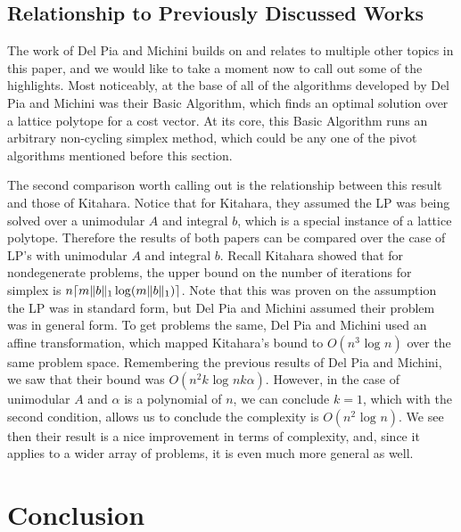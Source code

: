 \documentclass[11pt]{article}
\begin{document}
\subsection{Relationship to Previously Discussed Works}
The work of Del Pia and Michini builds on and relates to multiple other topics in this paper, and we would like to take a moment now to call out some of the highlights. Most noticeably, at the base of all of the algorithms developed by Del Pia and Michini was their Basic Algorithm, which finds an optimal solution over a lattice polytope for a cost vector. At its core, this Basic Algorithm runs an arbitrary non-cycling simplex method, which could be any one of the pivot algorithms mentioned before this section.

The second comparison worth calling out is the relationship between this result and those of Kitahara. Notice that for Kitahara, they assumed the LP was being solved over a unimodular $A$ and integral $b$, which is a special instance of a lattice polytope. Therefore the results of both papers can be compared over the case of LP's with unimodular $A$ and integral $b$. Recall Kitahara showed that for nondegenerate problems, the upper bound on the number of iterations for simplex is $n\lceil m \lVert b\rVert_1\log(m\lVert b\rVert_1)\rceil$. Note that this was proven on the assumption the LP was in standard form, but Del Pia and Michini assumed their problem was in general form. To get problems the same, Del Pia and Michini used an affine transformation, which mapped Kitahara's bound to $O(n^3 \text{ log } n)$ over the same problem space. Remembering the previous results of Del Pia and Michini, we saw that their bound was $O(n^2k \text{ log } nk\alpha)$. However, in the case of unimodular $A$ and $\alpha$ is a polynomial of $n$, we can conclude $k = 1$, which with the second condition, allows us to conclude the complexity is $O(n^2 \text{ log } n)$. We see then their result is a nice improvement in terms of complexity, and, since it applies to a wider array of problems, it is even much more general as well.

\section{Conclusion}


 
\end{document}
